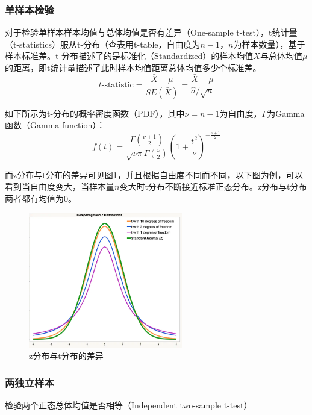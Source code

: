 \documentclass[11pt]{article}
\begin{document}
\subsubsection{单样本检验}

对于检验单样本样本均值与总体均值是否有差异（One-sample t-test），t统计量（t-statistics）服从t-分布（查表用t-table，自由度为$n-1$，$n$为样本数量），基于样本标准差。t-分布描述了的是标准化（Standardized）的样本均值$\bar{X}$与总体均值$\mu$的距离，即t统计量描述了此时\uline{样本均值距离总体均值多少个标准差}。
\begin{equation*}
    t\text{-statistic} = \frac{\bar{X}-\mu}{SE(\bar{X})} = \frac{\bar{X}-\mu}{\hat{\sigma}/\sqrt{n}}
\end{equation*}

如下所示为t-分布的概率密度函数（PDF），其中$\nu=n-1$为自由度，$\Gamma$为Gamma函数（Gamma function）：
\begin{equation*}
    f(t) = \frac{\Gamma\left( \frac{\nu+1}{2} \right)}{\sqrt{\nu\pi} \Gamma\left( \frac{\nu}{2} \right)} \left( 1+\frac{t^2}{\nu} \right)^{-\frac{\nu+1}{2}}
\end{equation*}

而z分布与t分布的差异可见图\ref{fig:z-and-t-dist}，并且根据自由度不同而不同，以下图为例，可以看到当自由度变大，当样本量$n$变大时t分布不断接近标准正态分布。z分布与t分布两者都有均值为$0$。
\begin{figure}[H]
    \centering
    \includegraphics[width=0.6\textwidth]{fig/z-dist-and-t-dist.png}
    \caption{z分布与t分布的差异}
    \label{fig:z-and-t-dist}
\end{figure}

\subsubsection{两独立样本}

检验两个正态总体均值是否相等（Independent two-sample t-test）
\end{document}
